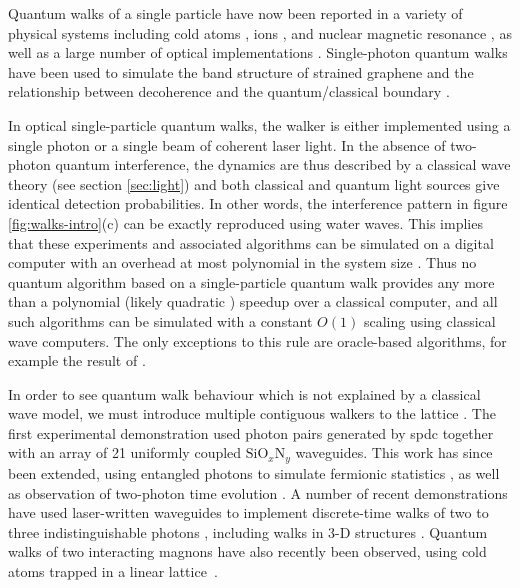 Quantum walks of a single particle have now been reported in a variety of physical systems including cold atoms \cite{Karski2009a}, ions \cite{Schmitz2009, Zahringer2010a}, and nuclear magnetic resonance \cite{Du2003},  as well as a large number of optical implementations \cite{Bouwmeester1999, Schreiber2010a, Schreiber2011}.  Single-photon quantum walks have been used to simulate the band structure of strained graphene \cite{Rechtsman2013} and the relationship between decoherence and the quantum/classical boundary \cite{Broome2010b}.

In optical single-particle quantum walks, the walker is either implemented using a single photon or a single beam of coherent laser light. In the absence of two-photon quantum interference, the dynamics are thus described by a classical wave theory (see section \ref{sec:light}) and both classical and quantum light sources give identical detection probabilities. In other words, the interference pattern in figure \ref{fig:walks-intro}(c) can be exactly reproduced using water waves. This implies that these experiments and associated algorithms can be simulated on a digital computer with an overhead at most polynomial in the system size \cite{Knight2003}. Thus no quantum algorithm based on a single-particle quantum walk provides any more than a polynomial (likely quadratic \cite{Aharonov2000}) speedup over a classical computer, and all such algorithms can be simulated with a constant $O(1)$ scaling using classical wave computers. The only exceptions to this rule are oracle-based algorithms, for example the result of \cite{Childs2003}.

In order to see quantum walk behaviour which is not explained by a classical wave model, we must introduce multiple contiguous walkers to the lattice \cite{Omar2006}.   The first experimental demonstration \cite{Peruzzo2010}  used photon pairs generated by \gls{spdc} together with an array of 21 uniformly coupled $\text{SiO}_x\text{N}_y$ waveguides. This work has since been extended, using entangled photons to simulate fermionic statistics \cite{Matthews2013}, as well as observation of two-photon time evolution \cite{Meinecke2013a}.
A number of recent demonstrations have used laser-written waveguides to implement discrete-time walks of two to three indistinguishable photons \cite{Sansoni2012, Crespi2013a, Crespi2013b}, including walks in 3-D structures \cite{Poulios2013a}.  Quantum walks of two interacting magnons have also recently been observed, using cold atoms trapped in a linear lattice~\cite{Fukuhara2013a}.

